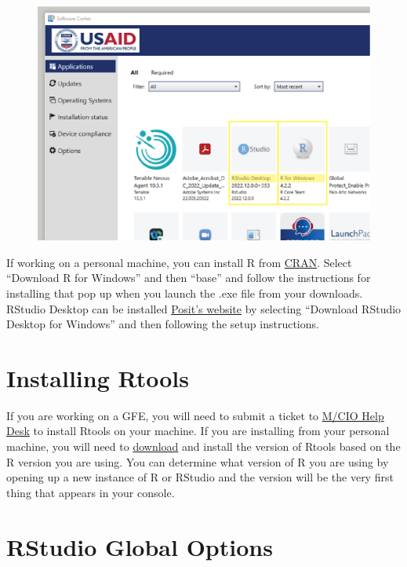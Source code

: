 \documentclass[
  letterpaper,
  DIV=11,
  numbers=noendperiod]{scrreprt}
\begin{document}
\begin{figure}

{\centering \includegraphics{./images/r_setup-software-center_r.png}

}

\end{figure}

If working on a personal machine, you can install R from
\href{https://cran.r-project.org/}{CRAN}. Select ``Download R for
Windows'' and then ``base'' and follow the instructions for installing
that pop up when you launch the .exe file from your downloads. RStudio
Desktop can be installed
\href{https://posit.co/download/rstudio-desktop/}{Posit's website} by
selecting ``Download RStudio Desktop for Windows'' and then following
the setup instructions.

\hypertarget{installing-rtools}{%
\section{Installing Rtools}\label{installing-rtools}}

If you are working on a GFE, you will need to submit a ticket to
\href{CIO-HELPDESK@usaid.gov}{M/CIO Help Desk} to install Rtools on your
machine. If you are installing from your personal machine, you will need
to \href{https://cran.r-project.org/bin/windows/Rtools/}{download} and
install the version of Rtools based on the R version you are using. You
can determine what version of R you are using by opening up a new
instance of R or RStudio and the version will be the very first thing
that appears in your console.

\hypertarget{rstudio-global-options}{%
\section{RStudio Global Options}\label{rstudio-global-options}}
\end{document}
